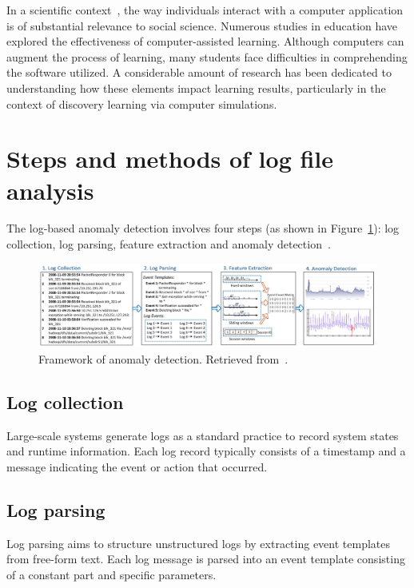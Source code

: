 In a scientific context~\cite{hulshof2005logfile}, the way individuals interact with a computer application is of substantial relevance to social science. Numerous studies in education have explored the effectiveness of computer-assisted learning. Although computers can augment the process of learning, many students face difficulties in comprehending the software utilized. A considerable amount of research has been dedicated to understanding how these elements impact learning results, particularly in the context of discovery learning via computer simulations.

\section{Steps and methods of log file analysis}
\label{sec:steps}
The log-based anomaly detection involves four steps (as shown in Figure~\ref{fig:anomaly-detection}): log collection, log parsing, feature extraction and anomaly detection~\cite{he2016expreport}.

\begin{figure}[H]
    \centering
    \includegraphics[width=\linewidth]{figures/anomaly-detection.png}
    \caption{Framework of anomaly detection. Retrieved from~\cite{he2016expreport}.}
    \label{fig:anomaly-detection}
\end{figure}

\subsection{Log collection}
Large-scale systems generate logs as a standard practice to record system states and runtime information. Each log record typically consists of a timestamp and a message indicating the event or action that occurred.~\cite{he2016expreport}

\subsection{Log parsing}
Log parsing aims to structure unstructured logs by extracting event templates from free-form text. Each log message is parsed into an event template consisting of a constant part and specific parameters.~\cite{he2016expreport}

